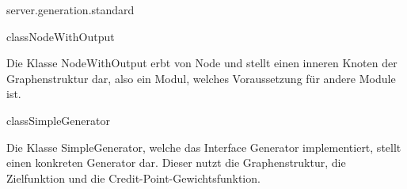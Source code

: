 \begin{texdocpackage}{server.generation.standard}
\begin{texdocclass}{class}{NodeWithOutput}
\label{texdoclet:edu.kit.informatik.studyplan.server.generation.standard.NodeWithOutput}
\begin{texdocclassintro}
Die Klasse NodeWithOutput erbt von Node und stellt einen 
 inneren Knoten der Graphenstruktur dar, also ein Modul, welches Voraussetzung
 für andere Module ist.\end{texdocclassintro}
\begin{texdocclassconstructors}
\end{texdocclassconstructors}
\begin{texdocclassmethods}
\end{texdocclassmethods}
\end{texdocclass}


\begin{texdocclass}{class}{SimpleGenerator}
\label{texdoclet:edu.kit.informatik.studyplan.server.generation.standard.SimpleGenerator}
\begin{texdocclassintro}
Die Klasse SimpleGenerator, welche das Interface Generator implementiert,
 stellt einen konkreten Generator dar. Dieser nutzt die Graphenstruktur, 
 die Zielfunktion und die Credit-Point-Gewichtsfunktion.\end{texdocclassintro}
\begin{texdocclassconstructors}
\end{texdocclassconstructors}
\begin{texdocclassmethods}
\end{texdocclassmethods}
\end{texdocclass}



\end{texdocpackage}
